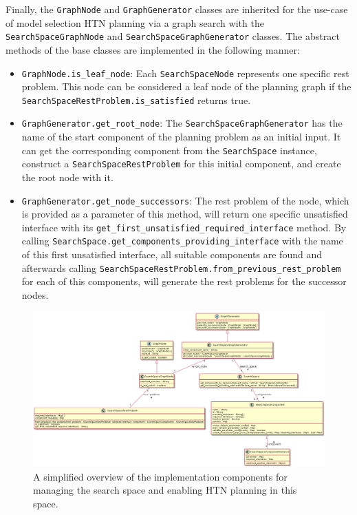 Finally, the \texttt{GraphNode} and \texttt{GraphGenerator} classes are inherited for the use-case of model selection HTN planning via a graph search with the \texttt{SearchSpaceGraphNode} and \texttt{SearchSpaceGraphGenerator} classes.
The abstract methods of the base classes are implemented in the following manner:
\begin{itemize}
    \item \texttt{GraphNode.is\_leaf\_node}: Each \texttt{SearchSpaceNode} represents one specific rest problem.
    This node can be considered a leaf node of the planning graph if the \texttt{SearchSpaceRestProblem.is\_satisfied} returns true.
    \item \texttt{GraphGenerator.get\_root\_node}: The \texttt{SearchSpaceGraphGenerator} has the name of the start component of the planning problem as an initial input.
    It can get the corresponding component from the \texttt{SearchSpace} instance, construct a \texttt{SearchSpaceRestProblem} for this initial component, and create the root node with it.
    \item \texttt{GraphGenerator.get\_node\_successors}: The rest problem of the node, which is provided as a parameter of this method, will return one specific unsatisfied interface with its \texttt{get\_first\_unsatisfied\_required\_interface} method.
    By calling \texttt{SearchSpace.get\_components\_providing\_interface} with the name of this first unsatisfied interface, all suitable components are found and afterwards calling \texttt{SearchSpaceRestProblem.from\_previous\_rest\_problem} for each of this components, will generate the rest problems for the successor nodes.
\end{itemize}

\begin{figure}[ht!]
    \centering
    \includegraphics[angle=90,origin=c,width=\textwidth,height=0.7\textheight,keepaspectratio]{gfx/Figures/Implementation/search-space/SearchSpaceManagement.png}
    \caption{A simplified overview of the implementation components for managing the search space and enabling HTN planning in this space.}
    \label{fig:implementation:uml:search-space}
\end{figure}

